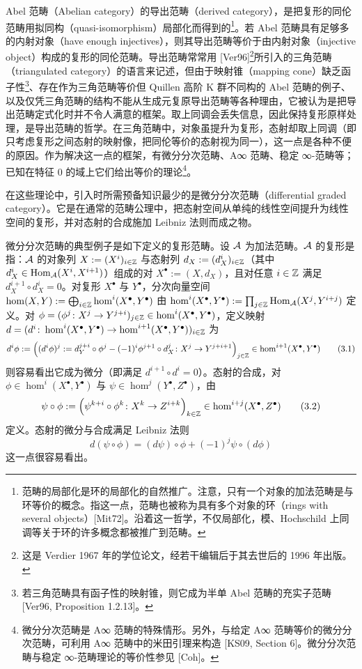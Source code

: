 Abel 范畴（Abelian category）的导出范畴（derived category），是把复形的同伦范畴用拟同构（quasi-isomorphism）局部化而得到的\footnote{范畴的局部化是环的局部化的自然推广。注意，只有一个对象的加法范畴是与环等价的概念。指这一点，范畴也被称为具有多个对象的环（rings with several objects）[Mit72]。沿着这一哲学，不仅局部化，模、Hochschild 上同调等关于环的许多概念都被推广到范畴。}。若 Abel 范畴具有足够多的内射对象（have enough injectives），则其导出范畴等价于由内射对象（injective object）构成的复形的同伦范畴。导出范畴常常用 [Ver96]\footnote{这是 Verdier 1967 年的学位论文，经若干编辑后于其去世后的 1996 年出版。}所引入的三角范畴（triangulated category）的语言来记述，但由于映射锥（mapping cone）缺乏函子性\footnote{若三角范畴具有函子性的映射锥，则它成为半单 Abel 范畴的充实子范畴 [Ver96, Proposition 1.2.13]。}、存在作为三角范畴等价但 Quillen 高阶 K 群不同构的 Abel 范畴的例子、以及仅凭三角范畴的结构不能从生成元复原导出范畴等各种理由，它被认为是把导出范畴定式化时并不令人满意的框架。取上同调会丢失信息，因此保持复形原样处理，是导出范畴的哲学。在三角范畴中，对象虽提升为复形，态射却取上同调（即只考虑复形之间态射的映射像，把同伦等价的态射视为同一），这一点是各种不便的原因。作为解决这一点的框架，有微分分次范畴、A∞ 范畴、稳定 ∞-范畴等；已知在特征 0 的域上它们给出等价的理论\footnote{微分分次范畴是 A∞ 范畴的特殊情形。另外，与给定 A∞ 范畴等价的微分分次范畴，可利用 A∞ 范畴中的米田引理来构造 [KS09, Section 6]。微分分次范畴与稳定 ∞-范畴理论的等价性参见 [Coh]。}。

在这些理论中，引入时所需预备知识最少的是微分分次范畴（differential graded category）。它是在通常的范畴公理中，把态射空间从单纯的线性空间提升为线性空间的复形，并对态射的合成施加 Leibniz 法则而成之物。

微分分次范畴的典型例子是如下定义的复形范畴。设 $\mathcal{A}$ 为加法范畴。$\mathcal{A}$ 的复形是指：$\mathcal{A}$ 的对象列 $X := (X^i)_{i\in\mathbb{Z}}$ 与态射列 $d_X := (d_X^i)_{i\in\mathbb{Z}}$（其中 $d_X^i\in\operatorname{Hom}_{\mathcal{A}}(X^i,X^{i+1})$）组成的对 $X^{\bullet} := (X,d_X)$，且对任意 $i\in\mathbb{Z}$ 满足 $d_X^{i+1}\circ d_X^i=0$。对复形 $X^{\bullet}$ 与 $Y^{\bullet}$，分次向量空间 $\hom(X,Y) := \bigoplus_{i\in\mathbb{Z}}\hom^i(X^{\bullet},Y^{\bullet})$ 由 $\hom^i(X^{\bullet},Y^{\bullet}) := \prod_{j\in\mathbb{Z}}\operatorname{Hom}_{\mathcal{A}}(X^j,Y^{i+j})$ 定义。对 $\phi=(\phi^j\colon X^j\to Y^{j+i})_{j\in\mathbb{Z}}\in\hom^i(X^{\bullet},Y^{\bullet})$，定义映射 $d=(d^i\colon\hom^i(X^{\bullet},Y^{\bullet})\to\hom^{i+1}(X^{\bullet},Y^{\bullet}))_{i\in\mathbb{Z}}$ 为
\begin{equation}
    d^i\phi := \Bigl( (d^i\phi)^j := d_Y^{j+i}\circ\phi^j - (-1)^i\phi^{j+1}\circ d_X^j \colon X^j\to Y^{j+i+1} \Bigr)_{j\in\mathbb{Z}}\in\hom^{i+1}(X^{\bullet},Y^{\bullet}) \tag{3.1}
\end{equation}
则容易看出它成为微分（即满足 $d^{i+1}\circ d^i=0$）。态射的合成，对 $\phi\in\hom^i(X^{\bullet},Y^{\bullet})$ 与 $\psi\in\hom^j(Y^{\bullet},Z^{\bullet})$，由
\begin{equation}
    \psi\circ\phi := \Bigl( \psi^{k+i}\circ\phi^k \colon X^k\to Z^{i+k} \Bigr)_{k\in\mathbb{Z}}\in\hom^{i+j}(X^{\bullet},Z^{\bullet}) \tag{3.2}
\end{equation}
定义。态射的微分与合成满足 Leibniz 法则
\begin{equation}
    d(\psi\circ\phi)=(d\psi)\circ\phi+(-1)^j\psi\circ(d\phi) \tag{3.3}
\end{equation}
这一点很容易看出。

